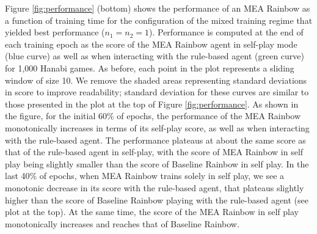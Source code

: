 \documentclass[letterpaper]{article} %
\begin{document}


 Figure \ref{fig:performance} (bottom) shows the performance of an MEA Rainbow  as a function of training time for the   configuration of the  mixed training regime that yielded best performance ($n_1=n_2=1$).
Performance is computed at the end of each training epoch as the score of the MEA Rainbow agent  in self-play mode  (blue curve) as well as  when interacting with the rule-based agent (green curve) for 1,000 Hanabi games.
As before, each point in the plot represents a  sliding window of size 10. We remove the shaded areas representing standard deviations in score to improve readability; standard deviation for these curves are similar to those presented in the plot at the top of   Figure \ref{fig:performance}.
As shown in the figure, for the initial 60\% of epochs, the performance of the MEA Rainbow monotonically increases in terms of its self-play score, as well as when interacting with the rule-based agent.
The performance plateaus at about the same score as that of the rule-based agent in self-play, with
the score of MEA Rainbow in self play being slightly smaller than the score of Baseline Rainbow in self play.
In the last 40\% of epochs, when MEA Rainbow trains solely in self play, we see a monotonic decrease in its score with the rule-based agent, that plateaus slightly higher than the score of  Baseline Rainbow playing with the rule-based agent (see plot at the top). At the same time, the score of the  MEA Rainbow in self play monotonically increases and reaches that of Baseline Rainbow.

\end{document}
